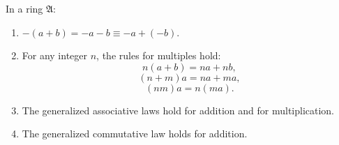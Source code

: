 In a ring $\mathfrak{A}$:

\begin{enumerate}
\item $-(a + b) = -a - b \equiv -a + (-b)$.
\item For any integer $n$, the rules for multiples hold:
  $$n(a + b) = na + nb,$$
  $$(n + m)a = na + ma,$$
  $$(nm)a = n(ma).$$
\item The generalized associative laws hold for addition and for multiplication.
\item The generalized commutative law holds for addition.
\end{enumerate}
